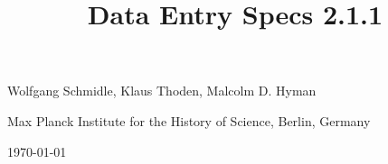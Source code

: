 \documentclass[fontsize=11pt, paper=a4, 
twoside, %
DIV15,
headings=normal,
parskip=half-, 
numbers=noenddot]{scrartcl}
\begin{document}
\title{Data Entry Specs 2.1.1}
\date{}
\author{}
\maketitle
\vspace{-20mm}

\begin{center}
\large Wolfgang Schmidle, Klaus Thoden, Malcolm D. Hyman

\normalsize Max Planck Institute for the History of Science, Berlin, Germany

\today
\end{center}

\tableofcontents
\newpage



\end{document}
